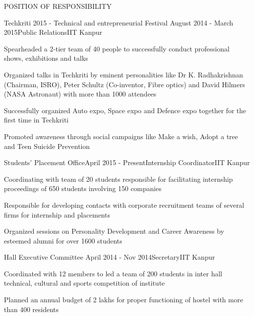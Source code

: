 \documentclass{resume} %
\begin{document}
\begin{rSection}{POSITION OF RESPONSIBILITY}

\begin{rSubsection}{Techkriti 2015 - Technical and entrepreneurial Festival }{August 2014 - March 2015}{Public Relations}{IIT Kanpur}
\item Spearheaded a 2-tier team of 40 people to successfully conduct professional shows, exhibitions and talks
\item Organized talks in Techkriti by eminent personalities like Dr K. Radhakrishnan (Chairman, ISRO), Peter Schultz (Co-inventor, Fibre optics) and David Hilmers (NASA Astronaut) with more than 1000 attendees
\item Successfully organized Auto expo, Space expo and Defence expo together for the first time in Techkriti
\item Promoted awareness through social campaigns like Make a wish, Adopt a tree and Teen Suicide Prevention
\end{rSubsection}


\begin{rSubsection}{Students' Placement Office}{April 2015 - Present}{Internship Coordinator}{IIT Kanpur}
\item Coordinating with team of 20 students responsible for facilitating internship proceedings of 650 students involving 150 companies
 \item Responsible for developing contacts with corporate recruitment teams of several firms for internship and placements 
 \item Organized sessions on Personality Development and Career Awareness by esteemed alumni for over 1600 students
\end{rSubsection}


\begin{rSubsection}{Hall Executive Committee }{April 2014 - Nov 2014}{Secretary}{IIT Kanpur}
\item Coordinated with 12 members to led a team of 200 students in inter hall technical, cultural and sports competition of institute 
\item Planned an annual budget of 2 lakhs for proper functioning of hostel with more than 400 residents
\end{rSubsection}

\end{rSection}
\end{document}
